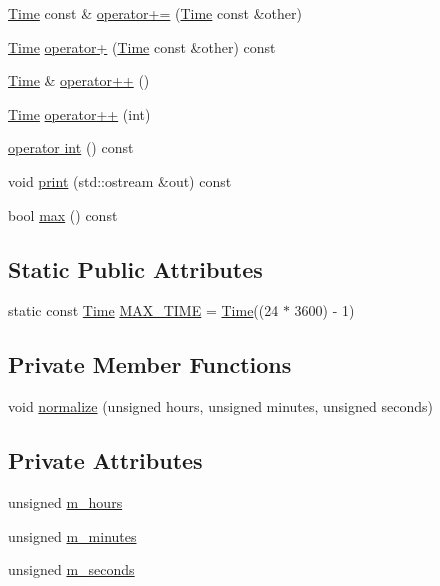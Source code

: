 \begin{DoxyCompactItemize}
\item 
\hyperlink{classTime}{Time} const  \& \hyperlink{classTime_a54a1d73b40abf9578a5d324d2805fdce}{operator+=} (\hyperlink{classTime}{Time} const \&other)
\item 
\hyperlink{classTime}{Time} \hyperlink{classTime_ace5e47a96c86c077b4e42b6713ae70de}{operator+} (\hyperlink{classTime}{Time} const \&other) const
\item 
\hyperlink{classTime}{Time} \& \hyperlink{classTime_a55e7ec82d5f390aa1896084e25a0f5a5}{operator++} ()
\item 
\hyperlink{classTime}{Time} \hyperlink{classTime_a9d672dbfc01b4d7f7d5789640017dc37}{operator++} (int)
\item 
\hyperlink{classTime_a7bc1d44c446e70740ab3f0dd64e457be}{operator int} () const
\item 
void \hyperlink{classTime_a2596ef53ebb188dc75b88160bd0aa230}{print} (std\+::ostream \&out) const
\item 
bool \hyperlink{classTime_a57f85c6b8295acdcf4e2f22ce7685170}{max} () const
\end{DoxyCompactItemize}
\subsection*{Static Public Attributes}
\begin{DoxyCompactItemize}
\item 
static const \hyperlink{classTime}{Time} \hyperlink{classTime_aeb625f84f2755479deac3ca3fd1d1cb4}{M\+A\+X\+\_\+\+T\+I\+ME} = \hyperlink{classTime}{Time}((24 $\ast$ 3600) -\/ 1)
\end{DoxyCompactItemize}
\subsection*{Private Member Functions}
\begin{DoxyCompactItemize}
\item 
void \hyperlink{classTime_a28eac7fba803ce12a29fdc565c37842c}{normalize} (unsigned hours, unsigned minutes, unsigned seconds)
\end{DoxyCompactItemize}
\subsection*{Private Attributes}
\begin{DoxyCompactItemize}
\item 
unsigned \hyperlink{classTime_a75b303219e28be4ef13dfb64e9a715b1}{m\+\_\+hours}
\item 
unsigned \hyperlink{classTime_abbae8355faea249a8777bf9b26f470fd}{m\+\_\+minutes}
\item 
unsigned \hyperlink{classTime_a068bd6e2a832b8eba85c5291b6321494}{m\+\_\+seconds}
\end{DoxyCompactItemize}
